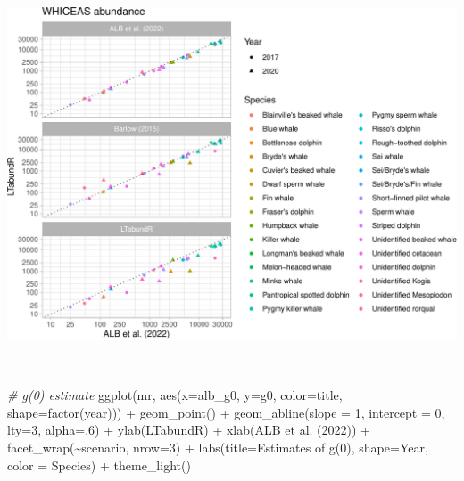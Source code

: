 \documentclass[
]{book}
\newenvironment{Shaded}{\begin{snugshade}}{\end{snugshade}}
\newcommand{\AttributeTok}[1]{\textcolor[rgb]{0.77,0.63,0.00}{#1}}
\newcommand{\CommentTok}[1]{\textcolor[rgb]{0.56,0.35,0.01}{\textit{#1}}}
\newcommand{\DecValTok}[1]{\textcolor[rgb]{0.00,0.00,0.81}{#1}}
\newcommand{\FunctionTok}[1]{\textcolor[rgb]{0.00,0.00,0.00}{#1}}
\newcommand{\NormalTok}[1]{#1}
\newcommand{\SpecialCharTok}[1]{\textcolor[rgb]{0.00,0.00,0.00}{#1}}
\newcommand{\StringTok}[1]{\textcolor[rgb]{0.31,0.60,0.02}{#1}}
\begin{document}
\includegraphics{figures/unnamed-chunk-387-1.pdf}

~

\begin{Shaded}
\begin{Highlighting}[]
\CommentTok{\# g(0) estimate}
\FunctionTok{ggplot}\NormalTok{(mr,}
       \FunctionTok{aes}\NormalTok{(}\AttributeTok{x=}\NormalTok{alb\_g0, }\AttributeTok{y=}\NormalTok{g0, }
           \AttributeTok{color=}\NormalTok{title, }\AttributeTok{shape=}\FunctionTok{factor}\NormalTok{(year))) }\SpecialCharTok{+}
    \FunctionTok{geom\_point}\NormalTok{() }\SpecialCharTok{+}
    \FunctionTok{geom\_abline}\NormalTok{(}\AttributeTok{slope =} \DecValTok{1}\NormalTok{, }\AttributeTok{intercept =} \DecValTok{0}\NormalTok{, }\AttributeTok{lty=}\DecValTok{3}\NormalTok{, }\AttributeTok{alpha=}\NormalTok{.}\DecValTok{6}\NormalTok{) }\SpecialCharTok{+}
    \FunctionTok{ylab}\NormalTok{(}\StringTok{\textquotesingle{}LTabundR\textquotesingle{}}\NormalTok{) }\SpecialCharTok{+} \FunctionTok{xlab}\NormalTok{(}\StringTok{\textquotesingle{}ALB et al. (2022)\textquotesingle{}}\NormalTok{) }\SpecialCharTok{+}
  \FunctionTok{facet\_wrap}\NormalTok{(}\SpecialCharTok{\textasciitilde{}}\NormalTok{scenario, }\AttributeTok{nrow=}\DecValTok{3}\NormalTok{) }\SpecialCharTok{+} 
  \FunctionTok{labs}\NormalTok{(}\AttributeTok{title=}\StringTok{\textquotesingle{}Estimates of g(0)\textquotesingle{}}\NormalTok{, }
       \AttributeTok{shape=}\StringTok{\textquotesingle{}Year\textquotesingle{}}\NormalTok{, }\AttributeTok{color =} \StringTok{\textquotesingle{}Species\textquotesingle{}}\NormalTok{) }\SpecialCharTok{+} 
  \FunctionTok{theme\_light}\NormalTok{()}
\end{Highlighting}
\end{Shaded}
\end{document}

